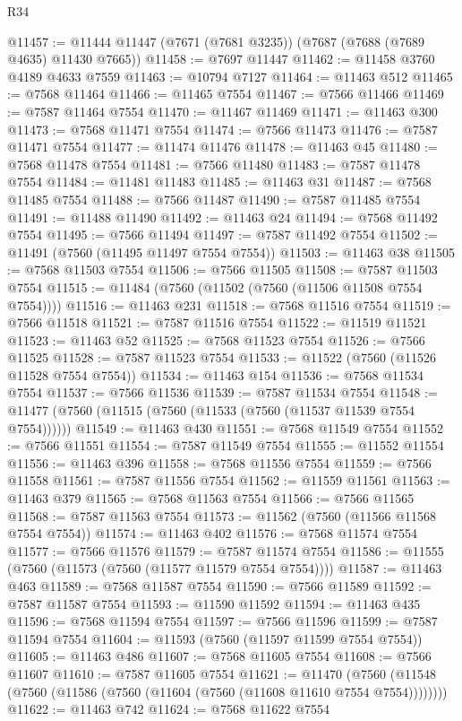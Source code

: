 \begin{lexlean}{R34}
\begin{coremodule}
@11457 := @11444 @11447 (@7671 (@7681 @3235)) (@7687 (@7688 (@7689 @4635) @11430 @7665))
@11458 := @7697 @11447
@11462 := @11458 @3760 @4189 @4633 @7559
@11463 := @10794 @7127
@11464 := @11463 @512
@11465 := @7568 @11464
@11466 := @11465 @7554
@11467 := @7566 @11466
@11469 := @7587 @11464 @7554
@11470 := @11467 @11469
@11471 := @11463 @300
@11473 := @7568 @11471 @7554
@11474 := @7566 @11473
@11476 := @7587 @11471 @7554
@11477 := @11474 @11476
@11478 := @11463 @45
@11480 := @7568 @11478 @7554
@11481 := @7566 @11480
@11483 := @7587 @11478 @7554
@11484 := @11481 @11483
@11485 := @11463 @31
@11487 := @7568 @11485 @7554
@11488 := @7566 @11487
@11490 := @7587 @11485 @7554
@11491 := @11488 @11490
@11492 := @11463 @24
@11494 := @7568 @11492 @7554
@11495 := @7566 @11494
@11497 := @7587 @11492 @7554
@11502 := @11491 (@7560 (@11495 @11497 @7554 @7554))
@11503 := @11463 @38
@11505 := @7568 @11503 @7554
@11506 := @7566 @11505
@11508 := @7587 @11503 @7554
@11515 := @11484 (@7560 (@11502 (@7560 (@11506 @11508 @7554 @7554))))
@11516 := @11463 @231
@11518 := @7568 @11516 @7554
@11519 := @7566 @11518
@11521 := @7587 @11516 @7554
@11522 := @11519 @11521
@11523 := @11463 @52
@11525 := @7568 @11523 @7554
@11526 := @7566 @11525
@11528 := @7587 @11523 @7554
@11533 := @11522 (@7560 (@11526 @11528 @7554 @7554))
@11534 := @11463 @154
@11536 := @7568 @11534 @7554
@11537 := @7566 @11536
@11539 := @7587 @11534 @7554
@11548 := @11477 (@7560 (@11515 (@7560 (@11533 (@7560 (@11537 @11539 @7554 @7554))))))
@11549 := @11463 @430
@11551 := @7568 @11549 @7554
@11552 := @7566 @11551
@11554 := @7587 @11549 @7554
@11555 := @11552 @11554
@11556 := @11463 @396
@11558 := @7568 @11556 @7554
@11559 := @7566 @11558
@11561 := @7587 @11556 @7554
@11562 := @11559 @11561
@11563 := @11463 @379
@11565 := @7568 @11563 @7554
@11566 := @7566 @11565
@11568 := @7587 @11563 @7554
@11573 := @11562 (@7560 (@11566 @11568 @7554 @7554))
@11574 := @11463 @402
@11576 := @7568 @11574 @7554
@11577 := @7566 @11576
@11579 := @7587 @11574 @7554
@11586 := @11555 (@7560 (@11573 (@7560 (@11577 @11579 @7554 @7554))))
@11587 := @11463 @463
@11589 := @7568 @11587 @7554
@11590 := @7566 @11589
@11592 := @7587 @11587 @7554
@11593 := @11590 @11592
@11594 := @11463 @435
@11596 := @7568 @11594 @7554
@11597 := @7566 @11596
@11599 := @7587 @11594 @7554
@11604 := @11593 (@7560 (@11597 @11599 @7554 @7554))
@11605 := @11463 @486
@11607 := @7568 @11605 @7554
@11608 := @7566 @11607
@11610 := @7587 @11605 @7554
@11621 := @11470
    (@7560 (@11548 (@7560 (@11586 (@7560 (@11604 (@7560 (@11608 @11610 @7554 @7554))))))))
@11622 := @11463 @742
@11624 := @7568 @11622 @7554

\end{coremodule}
\end{lexlean}

